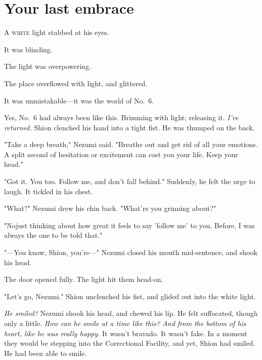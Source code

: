 
\chapter{Your last embrace}


\lettrine{A}{ white} light stabbed at his eyes.

It was blinding.

The light was overpowering.

The place overflowed with light, and glittered.

It was unmistakable---it was the world of No.~6.

\mybreak

Yes, No.~6 had always been like this. Brimming with light; releasing it.
\emph{I've returned.} Shion clenched his hand into a tight fist. He was thumped
on the back.

"Take a deep breath," Nezumi said. "Breathe out and get rid of all your
emotions. A split second of hesitation or excitement can cost you your
life. Keep your head."

"Got it. You too. Follow me, and don't fall behind." Suddenly, he felt
the urge to laugh. It tickled in his chest.

"What?" Nezumi drew his chin back. "What're you grinning about?"

"No\el just thinking about how great it feels to say 'follow me' to you.
Before, I was always the one to be told that."

"---You know, Shion, you're---" Nezumi closed his mouth mid-sentence, and
shook his head.

The door opened fully. The light hit them head-on.

"Let's go, Nezumi." Shion unclenched his fist, and glided out into the
white light.

\mybreak

\emph{He smiled?} Nezumi shook his head, and chewed his lip. He felt
suffocated, though only a little. \emph{How can he smile at a time like this?
And from the bottom of his heart, like he was really happy.} It wasn't
bravado. It wasn't fake. In a moment they would be stepping into the
Correctional Facility, and yet, Shion had smiled. He had been able to
smile.

